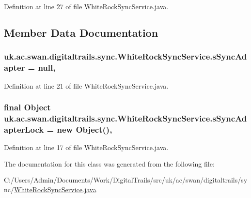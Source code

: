 Definition at line 27 of file White\+Rock\+Sync\+Service.\+java.



\subsection{Member Data Documentation}
\hypertarget{classuk_1_1ac_1_1swan_1_1digitaltrails_1_1sync_1_1_white_rock_sync_service_aaa633b71a751392a2c72b33a30e96a05}{
\subsubsection[{s\+Sync\+Adapter}]{ uk.\+ac.\+swan.\+digitaltrails.\+sync.\+White\+Rock\+Sync\+Service.\+s\+Sync\+Adapter = null\hspace{0.3cm}{\ttfamily [static]}, {\ttfamily [private]}}}\label{classuk_1_1ac_1_1swan_1_1digitaltrails_1_1sync_1_1_white_rock_sync_service_aaa633b71a751392a2c72b33a30e96a05}


Definition at line 21 of file White\+Rock\+Sync\+Service.\+java.

\hypertarget{classuk_1_1ac_1_1swan_1_1digitaltrails_1_1sync_1_1_white_rock_sync_service_a1c81378a4490fb6ed65b681432687fe3}{
\subsubsection[{s\+Sync\+Adapter\+Lock}]{\setlength{\rightskip}{0pt plus 5cm}final Object uk.\+ac.\+swan.\+digitaltrails.\+sync.\+White\+Rock\+Sync\+Service.\+s\+Sync\+Adapter\+Lock = new Object()\hspace{0.3cm}{\ttfamily [static]}, {\ttfamily [private]}}}\label{classuk_1_1ac_1_1swan_1_1digitaltrails_1_1sync_1_1_white_rock_sync_service_a1c81378a4490fb6ed65b681432687fe3}


Definition at line 17 of file White\+Rock\+Sync\+Service.\+java.



The documentation for this class was generated from the following file\+:\begin{DoxyCompactItemize}
\item 
C\+:/\+Users/\+Admin/\+Documents/\+Work/\+Digital\+Trails/src/uk/ac/swan/digitaltrails/sync/\hyperlink{_white_rock_sync_service_8java}{White\+Rock\+Sync\+Service.\+java}\end{DoxyCompactItemize}
